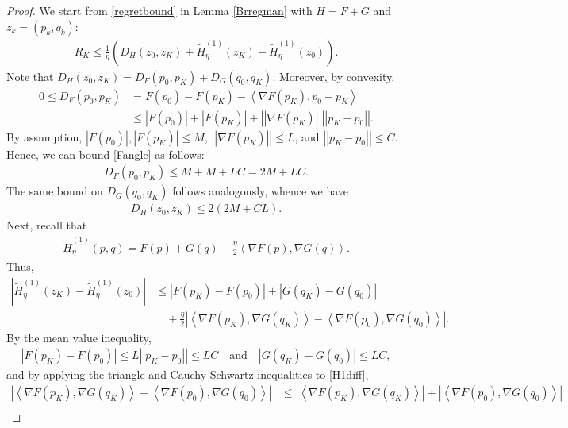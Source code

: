 \documentclass[11pt]{article}
\newcommand{\lnorm}{\left|\left|}
\newcommand{\rnorm}{\right|\right|}
\begin{document}
\begin{proof}
We start from \eqref{regretbound} in Lemma \ref{Brregman} with $H=F+G$ and $z_k=\left(p_k,q_k\right)$:
\begin{gather}
    R_{K}\leq\frac{1}{\eta}\left(D_{H}\left(z_{0},z_K\right)+\widetilde{H}_{\eta}^{(1)}\left(z_{K}\right)-\widetilde{H}_{\eta}^{(1)}\left(z_{0}\right)\right).\label{key}
\end{gather}
Note that $D_{H}\left(z_0,z_K\right)=D_{F}\left(p_0,p_K\right)+D_{G}\left(q_0,q_K\right)$. Moreover, by convexity,
\begin{align}
    0\leq D_F(p_0,p_K)&=F(p_0)-F(p_K)-\left<\nabla F(p_K),p_0-p_K\right>\nonumber\\ &\leq |F(p_0)|+|F(p_K)|+\lnorm\nabla F(p_K)\rnorm\lnorm p_K-p_0\rnorm.\label{Fangle}
\end{align}
By assumption, $\left|F(p_0)\right|,\left|F(p_K)\right|\leq M$, $\lnorm\nabla F(p_K)\rnorm\leq L$, and $\lnorm p_K-p_0\rnorm\leq C$. Hence, we can bound \eqref{Fangle} as follows:
\begin{gather*}
    D_F(p_0,p_K)\leq M+M+LC=2M+LC.
\end{gather*}
The same bound on $D_{G}\left(q_0,q_K\right)$ follows analogously, whence we have
\begin{gather}
    D_{H}\left(z_0,z_K\right)\leq 2\left(2M+CL\right).\label{DHbound}
\end{gather}
Next, recall that
\begin{gather*}
    \widetilde H^{(1)}_{\eta}(p,q)=F(p)+G(q)-\frac{\eta}{2}\left<\nabla F(p),\nabla G(q)\right>.
\end{gather*}
Thus,
\begin{subequations}\label{H1diff}
    \begin{align}
    \left|\widetilde H^{(1)}_{\eta}(z_K)-\widetilde H^{(1)}_{\eta}(z_0)\right|&\leq|F(p_K)-F(p_0)|+|G(q_K)-G(q_0)|
    \\ &\quad+\frac{\eta}{2}\left|\left<\nabla F(p_K),\nabla G(q_K)\right>-\left<\nabla F(p_0),\nabla G(q_0)\right>\right|.
\end{align}
\end{subequations}
By the mean value inequality,
\begin{gather}
    |F(p_K)-F(p_0)|\leq L\lnorm p_K-p_0\rnorm\leq LC\quad\textrm{and}\quad |G(q_K)-G(q_0)|\leq LC,\label{MVI}
\end{gather}
and by applying the triangle and Cauchy-Schwartz inequalities to \eqref{H1diff}, 
\begin{align}
    \left|\left<\nabla F(p_K),\nabla G(q_K)\right>-\left<\nabla F(p_0),\nabla G(q_0)\right>\right|&\leq\left|\left<\nabla F(p_K),\nabla G(q_K)\right>\right|+\left|\left<\nabla F(p_0),\nabla G(q_0)\right>\right|\nonumber\\

\end{align}
\end{proof}
\end{document}

